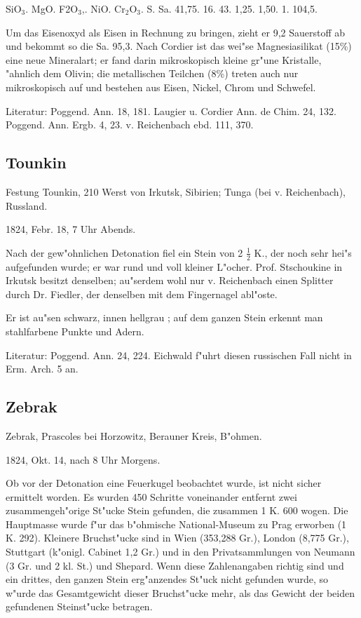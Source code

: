 \documentclass[a4paper, 11pt, oneside]{article}
\begin{document}
SiO$_{3}$. MgO. F2O$_{3}$,. NiO. Cr$_{2}$O$_{3}$. S. Sa.  
41,75. 16. 43. 1,25. 1,50. 1. 104,5.

Um das Eisenoxyd als Eisen in Rechnung zu bringen, zieht er 9,2 Sauerstoff ab und bekommt so die Sa. 95,3. Nach Cordier ist das wei"se Magnesiasilikat (15\%) eine neue Mineralart; er fand darin mikroskopisch kleine gr"une Kristalle, "ahnlich dem Olivin; die metallischen Teilchen (8\%) treten auch nur mikroskopisch auf und bestehen aus Eisen, Nickel, Chrom und Schwefel.

Literatur: Poggend. Ann. 18, 181. Laugier u. Cordier Ann. de Chim. 24, 132. Poggend. Ann. Ergb. 4, 23. v. Reichenbach ebd. 111, 370.

\subsection{Tounkin}

Festung Tounkin, 210 Werst von Irkutsk, Sibirien; Tunga (bei v. Reichenbach), Russland.

1824, Febr. 18, 7 Uhr Abends.

Nach der gew"ohnlichen Detonation fiel ein Stein von 2 $\frac{1}{2}$ K., der noch sehr hei"s aufgefunden wurde; er war rund und voll kleiner L"ocher. Prof. Stschoukine in Irkutsk besitzt denselben; au"serdem wohl nur v. Reichenbach einen Splitter durch Dr. Fiedler, der denselben mit dem Fingernagel abl"oste.

Er ist au"sen schwarz, innen hellgrau ; auf dem ganzen Stein erkennt man stahlfarbene Punkte und Adern.

Literatur: Poggend. Ann. 24, 224. Eichwald f"uhrt diesen russischen Fall nicht in Erm. Arch. 5 an.

\subsection{Zebrak}

Zebrak, Prascoles bei Horzowitz, Berauner Kreis, B"ohmen.

1824, Okt. 14, nach 8 Uhr Morgens.

Ob vor der Detonation eine Feuerkugel beobachtet wurde, ist nicht sicher ermittelt worden. Es wurden 450 Schritte voneinander entfernt zwei zusammengeh"orige St"ucke Stein gefunden, die zusammen 1 K. 600 wogen. Die Hauptmasse wurde f"ur das b"ohmische National-Museum zu Prag erworben (1 K. 292). Kleinere Bruchst"ucke sind in Wien (353,288 Gr.), London (8,775 Gr.), Stuttgart (k"onigl. Cabinet 1,2 Gr.) und in den Privatsammlungen von Neumann (3 Gr. und 2 kl. St.) und Shepard. Wenn diese Zahlenangaben richtig sind und ein drittes, den ganzen Stein erg"anzendes St"uck nicht gefunden wurde, so w"urde das Gesamtgewicht dieser Bruchst"ucke mehr, als das Gewicht der beiden gefundenen Steinst"ucke betragen.
\end{document}
